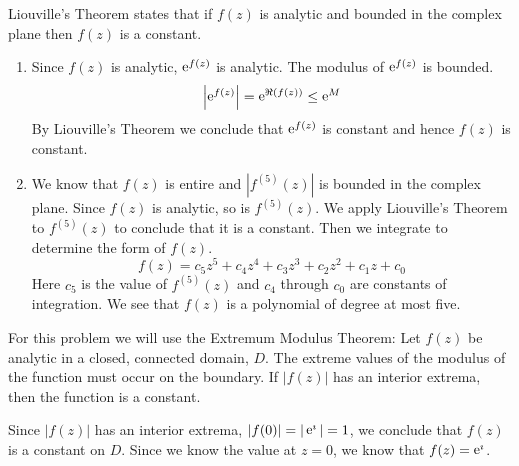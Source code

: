 {\begin{Solution}
  Liouville's Theorem states that if $f(z)$ is analytic and bounded 
  in the complex plane then $f(z)$ is a constant.
  \begin{enumerate}
  \item 
    Since $f(z)$ is analytic, $\mathop{\mathrm{e}}\nolimits^{f(z)}$ is analytic.  The modulus of $\mathop{\mathrm{e}}\nolimits^{f(z)}$
    is bounded.
    \[
    \left| \mathop{\mathrm{e}}\nolimits^{f(z)} \right| = \mathop{\mathrm{e}}\nolimits^{\Re(f(z))} \leq \mathop{\mathrm{e}}\nolimits^M
    \]
    By Liouville's Theorem we conclude that $\mathop{\mathrm{e}}\nolimits^{f(z)}$ is constant and hence
    $f(z)$ is constant.
  \item 
    We know that $f(z)$ is entire and $|f^{(5)}(z)|$ is bounded in the complex
    plane.  Since $f(z)$ is analytic, so is $f^{(5)}(z)$.  We apply Liouville's
    Theorem to $f^{(5)}(z)$ to conclude that it is a constant.  Then we integrate
    to determine the form of $f(z)$.
    \[
    f(z) = c_5 z^5 + c_4 z^4 + c_3 z^3 + c_2 z^2 + c_1 z + c_0
    \]
    Here $c_5$ is the value of $f^{(5)}(z)$ and $c_4$ through $c_0$ are constants of
    integration.
    We see that $f(z)$ is a polynomial of degree at most five.
  \end{enumerate}
\end{Solution}








\begin{Solution}
  For this problem we will use the 
  Extremum Modulus Theorem:
  Let $f(z)$ be analytic in a closed, connected domain, $D$.  The
  extreme values of the modulus of the function must occur on the
  boundary.  If $|f(z)|$ has an interior extrema, then the function
  is a constant.

  Since $|f(z)|$ has an interior extrema, $|f(0)| = |\mathop{\mathrm{e}}\nolimits^\imath| = 1$, we conclude
  that $f(z)$ is a constant on $D$.  Since we know the value at $z = 0$,
  we know that $f(z) = \mathop{\mathrm{e}}\nolimits^\imath$.
\end{Solution}







}
